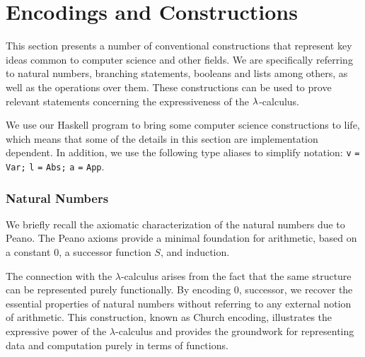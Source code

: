 \section{\centering Encodings and Constructions}

This section presents a number of conventional constructions that represent key ideas common to computer science and other fields. We are specifically referring to natural numbers, branching statements, booleans and lists among others, as well as the operations over them. These constructions can be used to prove relevant statements concerning the expressiveness of the $\lambda$-calculus.

\begin{note}
  We use our Haskell program to bring some computer science constructions to life, which means that some of the details in this section are implementation dependent. In addition, we use the following type aliases to simplify notation: \texttt{v} \; \texttt{=} \; \texttt{Var;} \texttt{l} \; \texttt{=} \; \texttt{Abs;} \texttt{a} \; \texttt{=} \; \texttt{App}.
\end{note}

\subsubsection{\centering Natural Numbers}
We briefly recall the axiomatic characterization of the natural numbers due to Peano. The Peano axioms provide a minimal foundation for arithmetic, based on a constant $0$, a successor function $S$, and induction.

The connection with the $\lambda$-calculus arises from the fact that the same structure can be represented purely functionally. By encoding $0$, successor, we recover the essential properties of natural numbers without referring to any external notion of arithmetic. This construction, known as Church encoding, illustrates the expressive power of the $\lambda$-calculus and provides the groundwork for representing data and computation purely in terms of functions.

